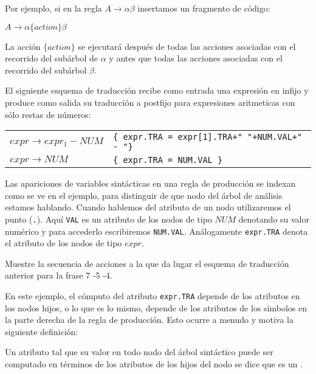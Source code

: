 Por ejemplo, si en la regla $A \rightarrow \alpha \beta $
insertamos un fragmento de código:

\begin{center}
$A \rightarrow \alpha \{ action \} \beta $
\end{center}

La acción $\{ action \}$ se ejecutará después de todas las acciones
asociadas con el recorrido del subárbol de $\alpha$ y antes que todas
las acciones asociadas con el recorrido del subárbol $\beta$.

El siguiente esquema de traducción recibe como entrada una expresión en infijo
y produce como salida su traducción a postfijo para expresiones aritmeticas con sólo 
restas de números:

\vspace{0.5cm}
\begin{tabular}{ll}
$expr   \rightarrow expr_1  -  NUM$  & \verb|{ expr.TRA = expr[1].TRA+" "+NUM.VAL+" - "}| \\
$expr   \rightarrow NUM$             & \verb|{ expr.TRA = NUM.VAL }|
\end{tabular}
\vspace{0.5cm}

Las apariciones de variables sintácticas en una regla de producción se indexan
como se ve en el ejemplo, para distinguir de que nodo del árbol de análisis estamos
hablando. Cuando hablemos del atributo de un nodo utilizaremos el punto (\verb|.|). 
Aquí \verb|VAL| es un atributo de los nodos de tipo $NUM$ denotando
su valor numérico y para accederlo escribiremos \verb|NUM.VAL|.
Análogamente \verb|expr.TRA| denota el atributo  de
los nodos de tipo $expr$.

\begin{exercise}
Muestre la secuencia de acciones a la
que da lugar el esquema de traducción anterior 
para la frase 7 -5 -4.
\end{exercise}

En este ejemplo, el cómputo del atributo \verb|expr.TRA| depende de los atributos
en los nodos hijos, o lo que es lo mismo, depende de los atributos de los símbolos
en la parte derecha de la regla de producción. Esto ocurre a menudo y motiva la siguiente
definición:

\begin{definition}
Un atributo tal que su valor en todo nodo del árbol sintáctico
puede ser computado en términos de los atributos de los hijos del nodo se dice
que es un .
\end{definition}

